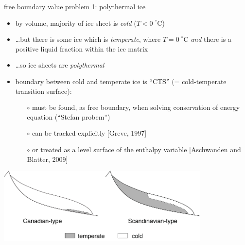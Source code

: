 \begin{frame}{free boundary value problem 1: polythermal ice}

\small
\begin{itemize}
\item by volume, majority of ice sheet is \emph{cold} ($T < 0\phantom{|}^\circ\text{C}$)
\item \dots but there is some ice which is \emph{temperate}, where $T = 0\phantom{|}^\circ\text{C}$ \emph{and} there is a positive liquid fraction within the ice matrix
\item \dots so ice sheets are \emph{polythermal}
\item boundary between cold and temperate ice is ``CTS'' (= cold-temperate transition surface):
  \begin{itemize}
  \item[$\circ$] must be found, as free boundary, when solving conservation of energy equation (``Stefan probem'')
  \item[$\circ$] can be tracked explicitly [Greve, 1997]\nocite{Greve}
  \item[$\circ$] or treated as a level surface of the enthalpy variable [Aschwanden and Blatter, 2009]\nocite{AschwandenBlatter}
  \end{itemize}
\end{itemize}

\begin{center}
\includegraphics[width=0.8\textwidth]{photos/polythermal_types}
\end{center}
\end{frame}


